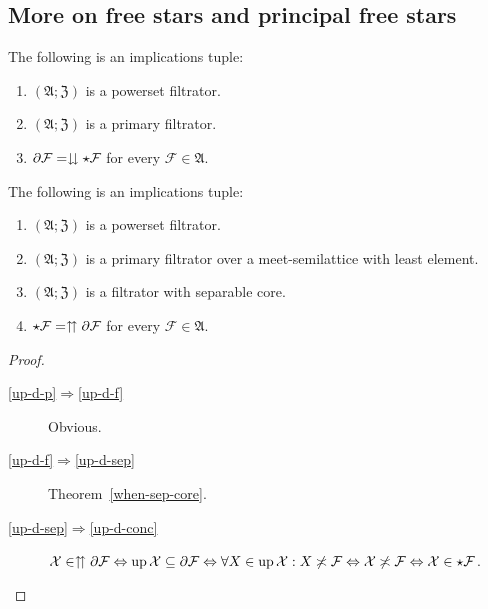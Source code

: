\subsection{More on free stars and principal free stars}
\begin{obvious}
The following is an implications tuple:
\begin{enumerate}
\item $(\mathfrak{A};\mathfrak{Z})$ is a powerset filtrator.
\item $(\mathfrak{A};\mathfrak{Z})$ is a primary filtrator.
\item $\partial\mathcal{F}=\downdownarrows\star\mathcal{F}$ for every
$\mathcal{F}\in\mathfrak{A}$.
\end{enumerate}
\end{obvious}
\begin{prop}
The following is an implications tuple:
\begin{enumerate}
\item \label{up-d-p}$(\mathfrak{A};\mathfrak{Z})$ is a powerset filtrator.
\item \label{up-d-f}$(\mathfrak{A};\mathfrak{Z})$ is a primary filtrator
over a meet-semilattice with least element.
\item \label{up-d-sep}$(\mathfrak{A};\mathfrak{Z})$ is a filtrator with
separable core.
\item \label{up-d-conc}$\star\mathcal{F}=\upuparrows\partial\mathcal{F}$
for every $\mathcal{F}\in\mathfrak{A}$.
\end{enumerate}
\end{prop}
\begin{proof}
~
\begin{description}
\item [{\ref{up-d-p}$\Rightarrow$\ref{up-d-f}}] Obvious.
\item [{\ref{up-d-f}$\Rightarrow$\ref{up-d-sep}}] Theorem~\ref{when-sep-core}.
\item [{\ref{up-d-sep}$\Rightarrow$\ref{up-d-conc}}] $\mathcal{X}\in\upuparrows\partial\mathcal{F}\Leftrightarrow\operatorname{up}\mathcal{X}\subseteq\partial\mathcal{F}\Leftrightarrow\forall X\in\operatorname{up}\mathcal{X}:X\not\asymp\mathcal{F}\Leftrightarrow\mathcal{X}\not\asymp\mathcal{F}\Leftrightarrow\mathcal{X}\in\star\mathcal{F}$.
\end{description}
\end{proof}

